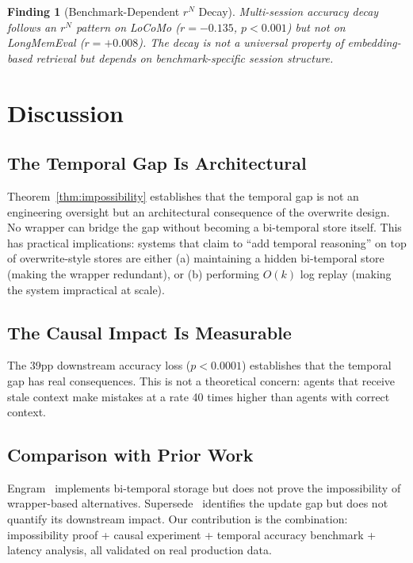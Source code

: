 \documentclass{article}
\newtheorem{finding}{Finding}
\begin{document}
\begin{finding}[Benchmark-Dependent $r^N$ Decay]
Multi-session accuracy decay follows an $r^N$ pattern on LoCoMo ($r = -0.135$, $p < 0.001$) but not on LongMemEval ($r = +0.008$). The decay is not a universal property of embedding-based retrieval but depends on benchmark-specific session structure.
\end{finding}

\section{Discussion}
\label{sec:disc}

\subsection{The Temporal Gap Is Architectural}
Theorem~\ref{thm:impossibility} establishes that the temporal gap is not an engineering oversight but an architectural consequence of the overwrite design. No wrapper can bridge the gap without becoming a bi-temporal store itself. This has practical implications: systems that claim to ``add temporal reasoning'' on top of overwrite-style stores are either (a) maintaining a hidden bi-temporal store (making the wrapper redundant), or (b) performing $O(k)$ log replay (making the system impractical at scale).

\subsection{The Causal Impact Is Measurable}
The 39pp downstream accuracy loss ($p < 0.0001$) establishes that the temporal gap has real consequences. This is not a theoretical concern: agents that receive stale context make mistakes at a rate 40 times higher than agents with correct context.

\subsection{Comparison with Prior Work}
Engram~\citep{engram} implements bi-temporal storage but does not prove the impossibility of wrapper-based alternatives. Supersede~\citep{supersede} identifies the update gap but does not quantify its downstream impact. Our contribution is the combination: impossibility proof + causal experiment + temporal accuracy benchmark + latency analysis, all validated on real production data.
\end{document}

